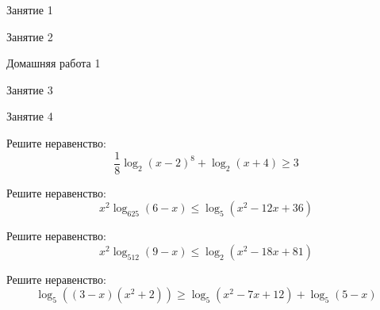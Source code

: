 %
%

\begin{class}[number=1]
	\begin{listofex}
		\item Занятие 1
	\end{listofex}
\end{class}

\begin{class}[number=2]
	\begin{listofex}
		\item Занятие 2
	\end{listofex}
\end{class}

\begin{homework}[number=1]
	\begin{listofex}
		\item Домашняя работа 1
	\end{listofex}
\end{homework}

\begin{class}[number=3]
	\begin{listofex}
		\item Занятие 3 
	\end{listofex}
\end{class}

\begin{class}[number=4]
	\begin{listofex}
		\item Занятие 4
	\end{listofex}
\end{class}

\begin{homework}[number=2]
	\begin{listofex}
		\item Решите неравенство:
		\[\dfrac{1}{8}\log_2(x-2)^8+\log_2(x+4)\geq3\]
		\item Решите неравенство:
		\[x^2\log_{625}(6-x)\leq\log_5(x^2-12x+36)\]
		\item Решите неравенство:
		\[x^2\log_{512}(9-x)\leq\log_2(x^2-18x+81)\]
		\item Решите неравенство:
		\[\log_5\left( (3-x)(x^2+2) \right)\geq\log_5(x^2-7x+12)+\log_5(5-x)\]
	\end{listofex}
\end{homework}


